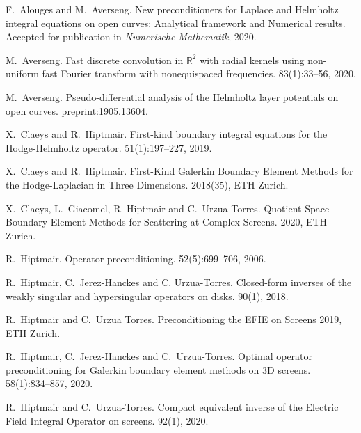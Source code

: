 \documentclass[]{article}
\begin{document}
\begin{thebibliography}{0}
	F.~Alouges and M.~Averseng.
	\newblock New preconditioners for Laplace and Helmholtz integral equations on open curves: Analytical framework and Numerical results. 
	\newblock Accepted for publication in {\em Numerische Mathematik}, 2020.
	
	M.~Averseng.
	\newblock Fast discrete convolution in $\mathbb {R}^{2} $ with radial kernels using non-uniform fast Fourier transform with nonequispaced frequencies. 
	 83(1):33--56, 2020.
	
	M.~Averseng. 
	\newblock Pseudo-differential analysis of the Helmholtz layer potentials on open curves. 
	 preprint:1905.13604.
	
	X.~Claeys and R.~Hiptmair.
	\newblock First-kind boundary integral equations for the {H}odge-{H}elmholtz operator.
	 51(1):197--227, 2019.
	
	X.~Claeys and R.~Hiptmair.
	\newblock First-Kind Galerkin Boundary Element Methods for the {H}odge-{L}aplacian in Three Dimensions.
	 2018(35), ETH Zurich.
	
	X.~Claeys, L.~Giacomel, R. Hiptmair and C.~Urzua-Torres.
	\newblock Quotient-Space Boundary Element Methods for Scattering at Complex Screens.
	 2020, ETH Zurich.
	
	
	R.~Hiptmair.
	\newblock Operator preconditioning.
	 52(5):699--706, 2006.
	
	
	R.~Hiptmair, C.~Jerez-Hanckes and C. Urzua-Torres.
	\newblock Closed-form inverses of the weakly singular and hypersingular operators on disks.
	 90(1), 2018.
	
	R.~Hiptmair and C.~Urzua Torres.
	Preconditioning the EFIE on Screens
	 2019, ETH Zurich.
	

	R.~Hiptmair, C.~Jerez-Hanckes and C.~Urzua-Torres.
	\newblock Optimal operator preconditioning for Galerkin boundary element methods on 3D screens. 
	 58(1):834--857, 2020.
	
	R.~Hiptmair and C.~Urzua-Torres.
	\newblock Compact equivalent inverse of the {E}lectric {F}ield
	{I}ntegral {O}perator on screens.
	 92(1), 2020.
	
\end{thebibliography}
\end{document}
